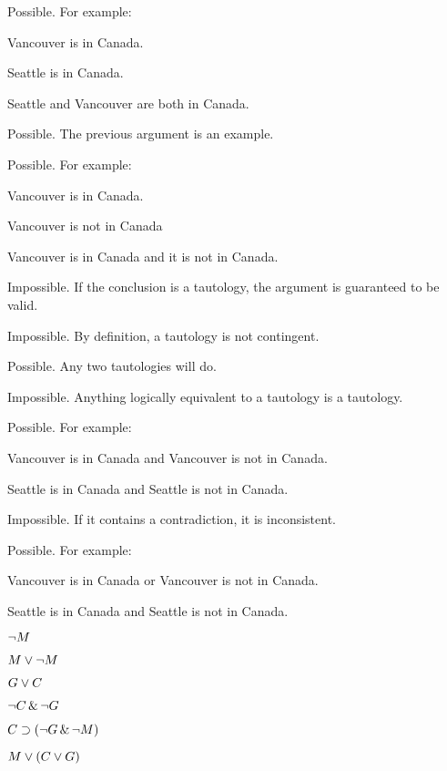 \begin{earg}
\item Possible. For example:
	\begin {earg}
	\item[] Vancouver is in Canada.
	\item[] Seattle is in Canada.
	\item[\therefore] Seattle and Vancouver are both in Canada.
	\end{earg}
\item[2.] Possible. The previous argument is an example.
\item[3.] Possible. For example:
	\begin {earg}
	\item[] Vancouver is in Canada.
	\item[] Vancouver is not in Canada
	\item[\therefore] Vancouver is in Canada and it is not in Canada.
	\end{earg}
\item[4.] Impossible. If the conclusion is a tautology, the argument is guaranteed to be valid.
\item[5.] Impossible. By definition, a tautology is not contingent.
\item[6.] Possible. Any two tautologies will do.
\item[7.] Impossible. Anything logically equivalent to a tautology is a tautology.
\item[8.] Possible. For example:
	\begin {earg}
	\item[] Vancouver is in Canada and Vancouver is not in Canada.
	\item[] Seattle is in Canada and Seattle is not in Canada.
	\end{earg}
\item[9.] Impossible. If it contains a contradiction, it is inconsistent.
\item[10.] Possible. For example:
	\begin {earg}
	\item[] Vancouver is in Canada or Vancouver is not in Canada.
	\item[] Seattle is in Canada and Seattle is not in Canada.
	\end{earg}
\end{earg}

\begin{earg}
\item $\neg M$
\item $M \vee \neg M$
\item $G \vee C$
\item $\neg C \,\&\, \neg G$
\item $C \supset (\neg G \,\&\, \neg M)$
\item $M \vee (C \vee G)$
\end{earg}

